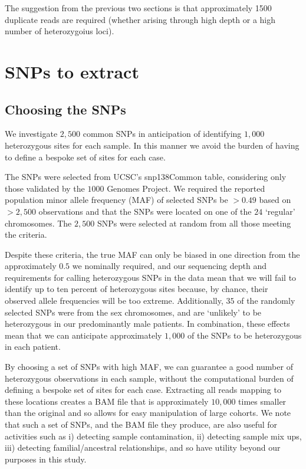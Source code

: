 \documentclass{article}
\begin{document}

The suggestion from the previous two sections is that approximately 1500 duplicate reads are required (whether arising through high depth or a high number of heterozygoius loci).
\clearpage{}

\section{SNPs to extract}
\label{sec:SNPs}

\subsection{Choosing the SNPs}

We investigate $2,500$ common SNPs in anticipation of identifying $1,000$ heterozygous sites for each sample. In this manner we avoid the burden of having to define a bespoke set of sites for each case.

The SNPs were selected from UCSC's snp138Common table, considering only those validated by the $1000$ Genomes Project. We required the reported population minor allele frequency (MAF) of selected SNPs be $>0.49$ based on $>2,500$ observations and that the SNPs were located on one of the $24$ `regular' chromosomes. The $2,500$  SNPs were selected at random from all those meeting the criteria. 

Despite these criteria, the true MAF can only be biased in one direction from the approximately $0.5$ we nominally required, and our sequencing depth and requirements for calling heterozygous SNPs in the data mean that we will fail to identify up to ten percent of heterozygous sites because, by chance, their observed allele frequencies will be too extreme. Additionally, $35$ of the randomly selected SNPs were from the sex chromosomes, and are `unlikely' to be heterozygous in our predominantly male patients. In combination, these effects mean that we can anticipate approximately $1,000$ of the SNPs to be heterozygous in each patient.

By choosing a set of SNPs with high MAF, we can guarantee a good number of heterozygous observations in each sample, without the computational burden of defining a bespoke set of sites for each case. Extracting all reads mapping to these locations creates a BAM file that is approximately $10,000$ times smaller than the original and so allows for easy manipulation of large cohorts. We note that such a set of SNPs, and the BAM file they produce, are also useful for activities such as i) detecting sample contamination, ii) detecting sample mix ups, iii) detecting familial/ancestral relationships, and so have utility beyond our purposes in this study.
\end{document}
